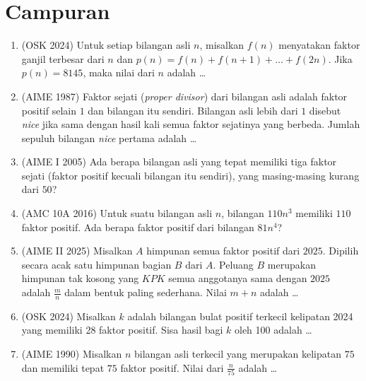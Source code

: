 \documentclass[12pt]{scrartcl}
\begin{document}
\section{Campuran}

\begin{enumerate}[resume]

	\item (OSK 2024)
	Untuk setiap bilangan asli $n$, misalkan $f(n)$ menyatakan faktor ganjil
	terbesar dari $n$ dan $p(n) = f(n) + f(n+1) + \dots + f(2n)$.
	Jika $p(n) = 8145$, maka nilai dari $n$ adalah \dots

	\item (AIME 1987)
	Faktor sejati (\textit{proper divisor}) dari bilangan asli adalah faktor positif selain $1$ dan
	bilangan itu sendiri. Bilangan asli lebih dari $1$ disebut \textit{nice}
	jika sama dengan hasil kali semua faktor sejatinya yang berbeda.
	Jumlah sepuluh bilangan \textit{nice} pertama adalah \dots

	\item (AIME I 2005)
	Ada berapa bilangan asli yang tepat memiliki tiga faktor sejati
	(faktor positif kecuali bilangan itu sendiri),
	yang masing-masing kurang dari $50$?

	\item (AMC 10A 2016)
	Untuk suatu bilangan asli $n$, bilangan $110n^{3}$ memiliki $110$ faktor
	positif. Ada berapa faktor positif dari bilangan $81n^{4}$?

	\item (AIME II 2025)
	Misalkan $A$ himpunan semua faktor positif dari $2025$.
	Dipilih secara acak satu himpunan bagian $B$ dari $A$.
	Peluang $B$ merupakan himpunan tak kosong yang $KPK$ semua anggotanya
	sama dengan $2025$ adalah $\frac{m}{n}$ dalam bentuk paling sederhana.
	Nilai $m + n$ adalah \dots

	\item (OSK 2024)
	Misalkan $k$ adalah bilangan bulat positif terkecil kelipatan 2024
	yang memiliki 28 faktor positif.
	Sisa hasil bagi $k$ oleh 100 adalah \dots

	\item (AIME 1990)
	Misalkan $n$ bilangan asli terkecil yang merupakan kelipatan $75$
	dan memiliki tepat $75$ faktor positif.
	Nilai dari $\frac{n}{75}$ adalah \dots


\end{enumerate}
\end{document}

